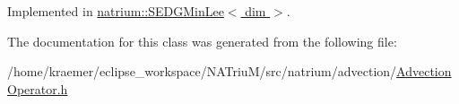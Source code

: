 Implemented in \hyperlink{classnatrium_1_1SEDGMinLee_ab3cf80e18230ee7f08f4ed9883b9dadd}{natrium\-::\-S\-E\-D\-G\-Min\-Lee$<$ dim $>$}.



The documentation for this class was generated from the following file\-:\begin{DoxyCompactItemize}
\item 
/home/kraemer/eclipse\-\_\-workspace/\-N\-A\-Triu\-M/src/natrium/advection/\hyperlink{AdvectionOperator_8h}{Advection\-Operator.\-h}\end{DoxyCompactItemize}
